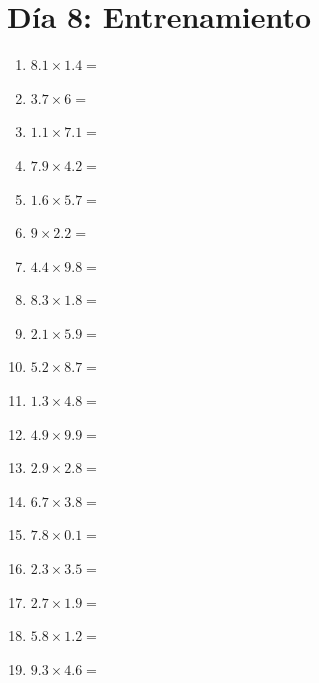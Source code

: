 \documentclass[12pt]{article}
\begin{document}
\section*{Día 8: Entrenamiento}
\begin{enumerate}
\item \large $ 8.1 \times 1.4 = $ \vspace{1.5cm}
\item \large $ 3.7 \times 6 = $ \vspace{1.5cm}
\item \large $ 1.1 \times 7.1 = $ \vspace{1.5cm}
\item \large $ 7.9 \times 4.2 = $ \vspace{1.5cm}
\item \large $ 1.6 \times 5.7 = $ \vspace{1.5cm}
\item \large $ 9 \times 2.2 = $ \vspace{1.5cm}
\item \large $ 4.4 \times 9.8 = $ \vspace{1.5cm}
\item \large $ 8.3 \times 1.8 = $ \vspace{1.5cm}
\item \large $ 2.1 \times 5.9 = $ \vspace{1.5cm}
\item \large $ 5.2 \times 8.7 = $ \vspace{1.5cm}
\newpage
\item \large $ 1.3 \times 4.8 = $ \vspace{1.5cm}
\item \large $ 4.9 \times 9.9 = $ \vspace{1.5cm}
\item \large $ 2.9 \times 2.8 = $ \vspace{1.5cm}
\item \large $ 6.7 \times 3.8 = $ \vspace{1.5cm}
\item \large $ 7.8 \times 0.1 = $ \vspace{1.5cm}
\item \large $ 2.3 \times 3.5 = $ \vspace{1.5cm}
\item \large $ 2.7 \times 1.9 = $ \vspace{1.5cm}
\item \large $ 5.8 \times 1.2 = $ \vspace{1.5cm}
\item \large $ 9.3 \times 4.6 = $ \vspace{1.5cm}

\end{enumerate}
\end{document}
